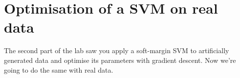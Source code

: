 \documentclass[a4paper]{article}
\begin{document}
\section{Optimisation of a SVM on real data}\label{SVM}
The second part of the lab saw you apply a soft-margin SVM to artificially generated data and optimise its parameters with gradient descent. Now we're going to do the same with real data.
\end{document}

